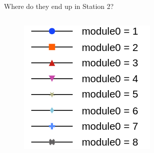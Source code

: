 \begin{frame}{Where do they end up in Station 2?}
\begin{columns}
        \begin{column}{0.2\linewidth}
            \begin{figure}
                \hspace{-7cm}\includegraphics[scale=0.25]{./assets/image.png}
            \end{figure}
        \end{column}
    \end{columns}
\end{frame}

